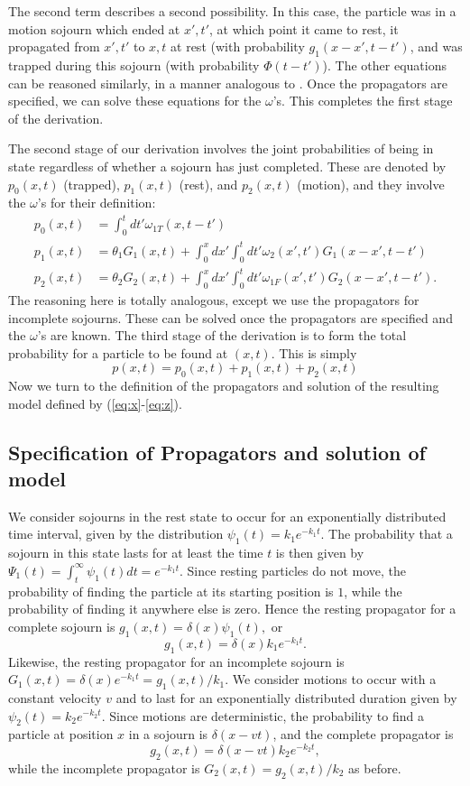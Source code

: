 \documentclass[]{agujournal2018}
\newcommand\be{\begin{equation}}
\newcommand\ee{\end{equation}}
\begin{document}
The second term describes a second possibility.
In this case, the particle was in a motion sojourn which ended at $x',t'$, at which point it came to rest, it propagated from $x',t'$ to $x,t$ at rest (with probability $g_1(x-x',t-t')$, and was trapped during this sojourn (with probability $\Phi(t-t')$).
The other equations can be reasoned similarly, in a manner analogous to \citet{Weiss1994}.
Once the propagators are specified, we can solve these equations for the $\omega$'s. This completes the first stage of the derivation.

The second stage of our derivation involves the joint probabilities of being in state regardless of whether a sojourn has just completed. These are denoted by  $p_0(x,t)$ (trapped), $p_1(x,t)$ (rest), and $p_2(x,t)$ (motion), and they involve the $\omega$'s for their definition:
\begin{align}
p_0(x,t) &= \int_0^t dt' \omega_{1T}(x,t-t')\\
p_1(x,t) &= \theta_1 G_1(x,t) + \int_0^x dx' \int_0^t dt' \omega_2(x',t')G_1(x-x',t-t')\\
p_2(x,t) &= \theta_2 G_2(x,t) + \int_0^x dx' \int_0^t dt' \omega_{1F}(x',t')G_2(x-x',t-t').\label{eq:z}
\end{align}
The reasoning here is totally analogous, except we use the propagators for incomplete sojourns.
These can be solved once the propagators are specified and the $\omega$'s are known.
The third stage of the derivation is to form the total probability for a particle to be found at $(x,t)$.
This is simply 
\be p(x,t) = p_0(x,t) + p_1(x,t) + p_2(x,t)\ee
Now we turn to the definition of the propagators and solution of the resulting model defined by (\ref{eq:x}-\ref{eq:z}).


\subsection{Specification of Propagators and solution of model}
We consider sojourns in the rest state to occur for an exponentially distributed time interval, given by the distribution $\psi_1(t) = k_1 e^{-k_1t}.$
The probability that a sojourn in this state lasts for at least the time $t$ is then given by $\Psi_1(t) = \int_t^\infty \psi_1(t)dt = e^{-k_1 t}$.
Since resting particles do not move, the probability of finding the particle at its starting position is $1$, while the probability of finding it anywhere else is zero.
Hence the resting propagator for a complete sojourn is $g_1(x,t) = \delta(x)\psi_1(t),$ or 
\be g_1(x,t) = \delta(x)k_1e^{-k_1t}.\label{eq:prop1} \ee
Likewise, the resting propagator for an incomplete sojourn is $G_1(x,t) = \delta(x)e^{-k_1t} = g_1(x,t)/k_1.$
We consider motions to occur with a constant velocity $v$ and to last for an exponentially distributed duration given by $\psi_2(t) = k_2 e^{-k_2t}.$
Since motions are deterministic, the probability to find a particle at position $x$ in a sojourn is $\delta(x-vt)$, and the complete propagator is 
\be g_2(x,t) = \delta(x-vt)k_2e^{-k_2t},\label{eq:prop2}\ee
while the incomplete propagator is $G_2(x,t) = g_2(x,t)/k_2$ as before.
\end{document}
